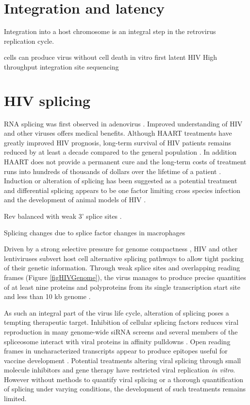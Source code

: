 \documentclass[../sherrill-Mix_thesis.tex]{subfiles}
\begin{document}
\section{Integration and latency}
	Integration into a host chromosome is an integral step in the retrovirus replication cycle.

	cells can produce virus without cell death in vitro \citep{Hoxie1985}
	first latent HIV \citep{Folks1986}
	High throughput integration site sequencing \citep{Schroder2002,Wang2007} %


\section{HIV splicing}
	RNA splicing was first observed in adenovirus \citep{Berget1977,Chow1977}. Improved understanding of HIV and other viruses offers medical benefits. Although HAART treatments have greatly improved HIV prognosis, long-term survival of HIV patients remains reduced by at least a decade compared to the general population \citep{Lohse2007}. In addition HAART does not provide a permanent cure \citep{Richman2009} and the long-term costs of treatment runs into hundreds of thousands of dollars over the lifetime of a patient \citep{Hutchinson2006,Schackman2006}.  Induction or alteration of splicing has been suggested as a potential treatment \citep{Fukuhara2006,Mandal2010} and differential splicing appears to be one factor limiting cross species infection and the development of animal models of HIV \citep{Zheng2003}. 

	Rev balanced with weak 3' splice sites \citep{Kammler2006}.

	Splicing changes due to splice factor changes in macrophages \citep{Dowling2008}

	Driven by a strong selective pressure for genome compactness \citep{Gelinas1986,Herman1987,Shin2000}, HIV and other lentiviruses subvert host cell alternative splicing pathways to allow tight packing of their genetic information. Through weak splice sites and overlapping reading frames (Figure \ref{figHIVGenome}), the virus manages to produce precise quantities of at least nine proteins and polyproteins from its single transcription start site and less than 10 kb genome \citep{Stoltzfus2009}. 

	As such an integral part of the virus life cycle\citep{Kim1989,Pomerantz1990}, alteration of splicing poses a tempting therapeutic target. Inhibition of cellular splicing factors reduces viral reproduction in many genome-wide siRNA screens \citep{Brass2008,Konig2008,Bushman2009} and several members of the spliceosome interact with viral proteins in affinity pulldowns \citep{Jager2012}. Open reading frames in uncharacterized transcripts appear to produce epitopes useful for vaccine development \citep{Bansal2010}. Potential treatments altering viral splicing through small molecule inhibitors \citep{Fukuhara2006,Bakkour2007} and gene therapy \citep{Asparuhova2007,Mandal2010} have restricted viral replication \emph{in vitro}. However without methods to quantify viral splicing or a thorough quantification of splicing under varying conditions, the development of such treatments remains limited. 
\end{document}
